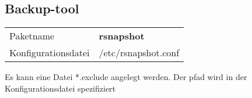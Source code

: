 \subsection{Backup-tool}
\begin{tabular}{l|l}
Paketname & \textbf{rsnapshot} \\ 
Konfigurationsdatei & /etc/rsnapshot.conf \\
\end{tabular}
Es kann eine Datei *.exclude angelegt werden. Der pfad wird in der Konfigurationsdatei spezifiziert
